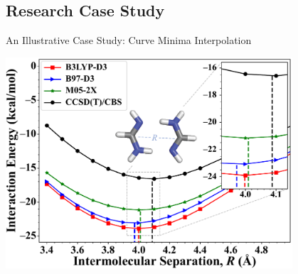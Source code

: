 \documentclass[11pt,table]{beamer}
\begin{document}
\subsection{Research Case Study}
\begin{frame}{An Illustrative Case Study: Curve Minima Interpolation}

\begin{center}
\includegraphics[width=0.8\textwidth]{includes/figure4.pdf}
\end{center}

\end{frame}
%
%
%
%
%



\end{document}
